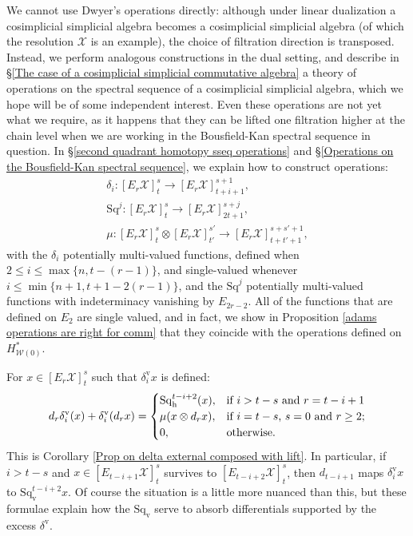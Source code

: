 \documentclass[11pt]{amsart} \renewcommand{\baselinestretch}{1.2}
\theoremstyle{plain}
\theoremstyle{definition}
\renewcommand{\to}{\longrightarrow}
\newcommand{\calw}{\mathcal{W}}
\newcommand{\calx}{\mathcal{X}}
\newcommand{\Sq}{\mathrm{Sq}}
\newcommand{\E}[5]{[E^{#1}_{#2}#3]^{#4}_{#5}}
\newcommand{\Edownup}[5]{[E_{#1}^{#2}#3]^{#4}_{#5}}
\newcommand{\uver}{^\mathrm{v}}
\newcommand{\dver}{_\mathrm{v}}
\newcommand{\dhor}{_\mathrm{h}}
\newcommand{\Sqh}{\mathrm{Sq}\dhor}
\newcommand{\Sqv}{\mathrm{Sq}\dver}
\newcommand{\deltav}{\delta\uver}
\begin{document}
\begin{Introduction}
We cannot use Dwyer's operations directly: although under linear dualization a cosimplicial simplicial algebra becomes a cosimplicial simplicial algebra (of which the resolution $\calx$ is an example), the choice of filtration direction is transposed. Instead, we perform analogous constructions in the dual setting, and describe in \S\ref{The case of a cosimplicial simplicial commutative algebra} a theory of operations on the spectral sequence of a cosimplicial simplicial algebra, which we hope will be of some independent interest. Even these operations are not yet what we require, as it happens that they can be lifted one filtration higher at the chain level when we are working in the Bousfield-Kan spectral sequence in question. In \S\ref{second quadrant homotopy sseq operations} and \S\ref{Operations on the Bousfield-Kan spectral sequence}, we explain how to construct operations:
\begin{gather*}
\delta_i:\Edownup{r}{}{\calx}{s}{t} \to \Edownup{r}{}{\calx}{s+1}{t+i+1},
\\
\Sq^j:\Edownup{r}{}{\calx}{s}{t}   \to
\Edownup{r}{}{\calx}{s+j}{2t+1},\\
\mu:\Edownup{r}{}{\calx}{s}{t}\otimes \Edownup{r}{}{\calx}{s'}{t'}\to
\Edownup{r}{}{\calx}{s+s'+1}{t+t'+1},
\end{gather*}
with the $\delta_i$ potentially multi-valued functions,  defined when $2\leq i\leq \max\{n,t-(r-1)\}$, and single-valued whenever $i\leq\min\{n+1,t+1-2(r-1)\}$, and the $\Sq^j$ potentially multi-valued functions with indeterminacy vanishing by $E_{2r-2}$. All of the functions that are  defined on $E_2$ are single valued, and in fact, we show in Proposition \ref{adams operations are right for comm} that they coincide with the operations defined on $H^*_{\calw(0)}$.

For $x\in \E{}{r}{\calx}{s}{t}$ such that  $\deltav_ix $ is defined:
\[d_r\deltav_i(x)+ \deltav_i(d_rx)=\begin{cases}
\Sqh^{t-i+2}(x),&\textup{if $i>t-s$ and $r =t-i+1$}\\
\mu(x\otimes d_rx),&\textup{if $i=t-s$,  $s=0$ and $r\geq2$};\\
0,&\textup{otherwise.}
\end{cases}\]
This is Corollary \ref{Prop on delta external composed with lift}. In particular, if $i>t-s$ and $x\in\E{}{t-i+1}{\calx}{s}{t}$ survives to $\E{}{t-i+2}{\calx}{s}{t}$, then $d_{t-i+1}$ maps $\deltav_ix$ to $\Sqv^{t-i+2}x$. Of course the situation is a little more nuanced than this, but these formulae explain how the $\Sqv$ serve to absorb differentials supported by the excess $\deltav$.


\end{Introduction}
\end{document}
